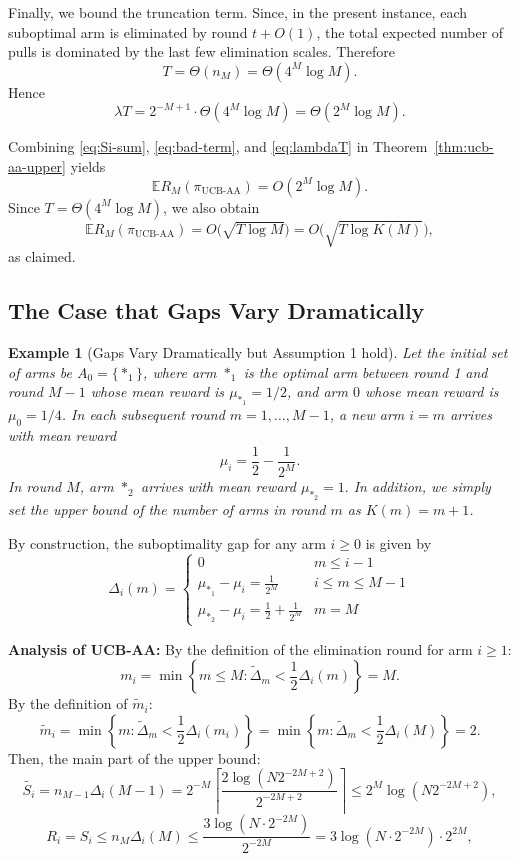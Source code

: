 \documentclass[
  12pt]{article}
\newtheorem{example}{Example}
\begin{document}
Finally, we bound the truncation term. Since, in the present instance, each suboptimal arm
is eliminated by round $t+O(1)$, the total expected number of pulls is dominated by the last
few elimination scales. Therefore
\[
T=\Theta(n_M)=\Theta(4^M\log M).
\]
Hence
\begin{equation}
\label{eq:lambdaT}
\lambda T
=
2^{-M+1}\cdot \Theta(4^M\log M)
=
\Theta(2^M\log M).
\end{equation}

Combining \eqref{eq:Si-sum}, \eqref{eq:bad-term}, and \eqref{eq:lambdaT} in
Theorem~\ref{thm:ucb-aa-upper} yields
\[
\mathbb{E}R_M(\pi_{\mathrm{UCB\text{-}AA}})
=
O(2^M\log M).
\]
Since $T=\Theta(4^M\log M)$, we also obtain
\[
\mathbb{E}R_M(\pi_{\mathrm{UCB\text{-}AA}})
=
O\bigl(\sqrt{T\log M}\bigr)
=
O\bigl(\sqrt{T\log K(M)}\bigr),
\]
as claimed.



\subsection{The Case that Gaps Vary Dramatically}\label{sec:The Case that Gaps Vary Dramatically}


\begin{example}[Gaps Vary Dramatically but Assumption 1 hold]
\label{Example 4}
Let the initial set of arms be $A_0 = \{*_1\}$, where arm $*_1$ is the optimal arm between round 1 and round $M-1$ whose mean reward is $\mu_{*_1} = 1/2$, and arm $0$ whose mean reward is $\mu_0 = 1/4$. In each subsequent round $m=1, \dots, M-1$, a new arm $i=m$ arrives with mean reward 
$$\mu_i = \frac{1}{2} - \frac{1}{2^{M}}.$$ In round $M$, arm $*_2$ arrives with mean reward $\mu_{*_2} =1.$
In addition, we simply set the upper bound of the number of arms in round $m$ as $K(m)=m+1$.
\end{example}

By construction, the suboptimality gap for any arm $i \ge 0$ is given by 
\[\Delta_i(m)=\begin{cases}
      0        & m\leq i-1\\
    \mu_{*_1} - \mu_i = \frac{1}{2^{M}}  & i\leq m\leq M-1\\
    \mu_{*_2} - \mu_i = \frac{1}{2} +\frac{1}{2^{M}}&m=M 
\end{cases}\]


\textbf{Analysis of UCB-AA:} 
By the definition of the elimination round for arm $i \geq1$:
$$m_i = \min \left\{ m \leq M : \tilde{\Delta}_m < \frac{1}{2}\Delta_i(m) \right\}=M.$$
By the definition of $\tilde{m}_i$:
$$ \tilde{m}_{i} = \min\left\{ m: \tilde{\Delta}_{m} < \frac{1}{2}\Delta_{i}(m_i) \right\}=\min\left\{ m: \tilde{\Delta}_{m} < \frac{1}{2}\Delta_{i}(M) \right\}=2.$$
Then, the main part of the upper bound: 
$$\tilde{S_i}=n_{M-1}\Delta_i(M-1)= 2^{-M} \left\lceil \frac{2 \log(N 2^{-2M+2})}{2^{-2M+2}} \right\rceil  \leq 2^{M} \log(N 2^{-2M+2}),$$
$$R_i=S_i\leq n_{M} \Delta_i(M) \le  \frac{3 \log (N \cdot 2^{-2M})}{2^{-2M} }  =3\log (N \cdot 2^{-2M}) \cdot 2^{2M}, $$
\end{document}
